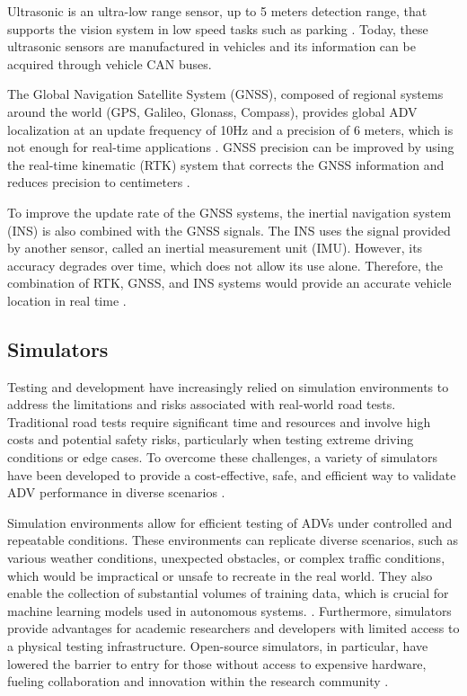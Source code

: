 Ultrasonic is an ultra-low range sensor, up to 5 meters detection range, that supports the vision system in low speed tasks such as parking \cite{Zong2018}. Today, these ultrasonic sensors are manufactured in vehicles and its information can be acquired through vehicle CAN buses.

The Global Navigation Satellite System (GNSS), composed of regional systems around the world (GPS, Galileo, Glonass, Compass), provides global ADV localization at an update frequency of 10Hz and a precision of 6 meters, which is not enough for real-time applications \cite{Liu2019}.  GNSS precision can be improved by using the real-time kinematic (RTK) system that corrects the GNSS information and reduces precision to centimeters \cite{Buyval2019}. 

To improve the update rate of the GNSS systems, the inertial navigation system (INS) is also combined with the GNSS signals. The INS uses the signal provided by another sensor, called an inertial measurement unit (IMU). However, its accuracy degrades over time, which does not allow its use alone. Therefore, the combination of RTK, GNSS, and INS systems would provide an accurate vehicle location in real time \cite{Liu2019}.

\subsection{Simulators}
Testing and development have increasingly relied on simulation environments to address the limitations and risks associated with real-world road tests. Traditional road tests require significant time and resources and involve high costs and potential safety risks, particularly when testing extreme driving conditions or edge cases. To overcome these challenges, a variety of simulators have been developed to provide a cost-effective, safe, and efficient way to validate ADV performance in diverse scenarios \cite{Zhang2024}.

Simulation environments allow for efficient testing of ADVs under controlled and repeatable conditions. These environments can replicate diverse scenarios, such as various weather conditions, unexpected obstacles, or complex traffic conditions, which would be impractical or unsafe to recreate in the real world. They also enable the collection of substantial volumes of training data, which is crucial for machine learning models used in autonomous systems. \cite{Zhou2022}. Furthermore, simulators provide advantages for academic researchers and developers with limited access to a physical testing infrastructure. Open-source simulators, in particular, have lowered the barrier to entry for those without access to expensive hardware, fueling collaboration and innovation within the research community \cite{Li2024}.

